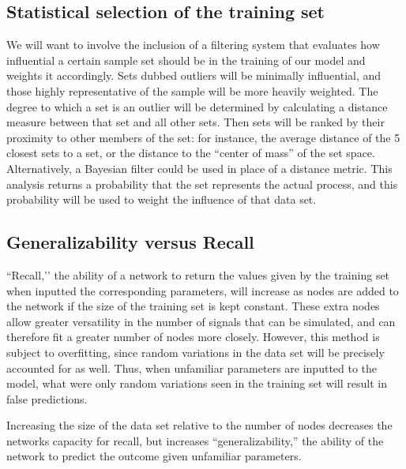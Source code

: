 \documentclass[10pt]{article}
\begin{document}
\subsection{Statistical selection of the training set}
We will want to involve the inclusion of a filtering system that evaluates how influential a certain sample set should be in the training of our model and weights it accordingly. Sets dubbed outliers will be minimally influential, and those highly representative of the sample will be more heavily weighted. The degree to which a set is an outlier will be determined by calculating a distance measure between that set and all other sets. Then sets will be ranked by their proximity to other members of the set: for instance, the average distance of the 5 closest sets to a set, or the distance to the “center of mass” of the set space. Alternatively, a Bayesian filter could be used in place of a distance metric. This analysis returns a probability that the set represents the actual process, and this probability will be used to weight the influence of that data set.


\subsection{Generalizability versus Recall}
``Recall,’’ the ability of a network to return the values given by the training set when inputted the corresponding parameters, will increase as nodes are added to the network if the size of the training set is kept constant. These extra nodes allow greater versatility in the number of signals that can be simulated, and can therefore fit a greater number of nodes more closely. However, this method is subject to overfitting, since random variations in the data set will be precisely accounted for as well. Thus, when unfamiliar parameters are inputted to the model, what were only random variations seen in the training set will result in false predictions.

Increasing the size of the data set relative to the number of nodes decreases the networks capacity for recall, but increases “generalizability,” the ability of the network to predict the outcome given unfamiliar parameters.
\end{document}
